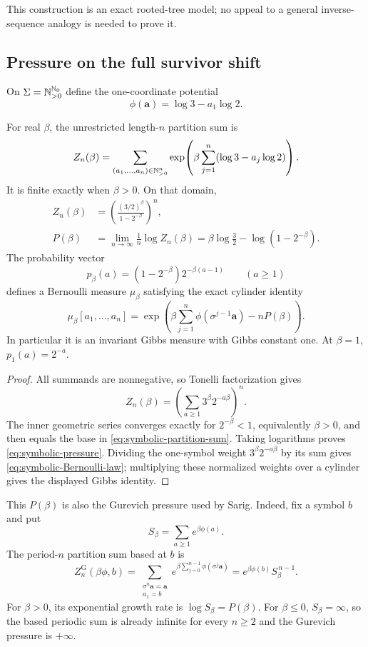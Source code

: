 This construction is an exact rooted-tree model; no appeal to a general
inverse-sequence analogy is needed to prove it.

\subsection{Pressure on the full survivor shift}

On $\Sigma=\mathbb{N}_{>0}^{\mathbb{N}_{0}}$ define the one-coordinate potential
\[
 \phi(\mathbf a)=\log3-a_1\log2.
\]

\begin{theorem}
\label{thm:symbolic-full-shift-pressure}
For real $\beta$, the unrestricted length-$n$ partition sum is
\[
 Z_n(\beta)=
 \sum_{(a_1,\ldots,a_n)\in\mathbb{N}_{>0}^n}
 \exp\!\left(\beta\sum_{j=1}^n(\log3-a_j\log2)\right).
\]
It is finite exactly when $\beta>0$.  On that domain,
\begin{align}
 Z_n(\beta)
 &=\left(\frac{(3/2)^\beta}{1-2^{-\beta}}\right)^n,\label{eq:symbolic-partition-sum}\\
 P(\beta)
 &=\lim_{n\to\infty}\frac1n\log Z_n(\beta)
 =\beta\log\frac32-\log(1-2^{-\beta}).
 \label{eq:symbolic-pressure}
\end{align}
The probability vector
\begin{equation}
\label{eq:symbolic-Bernoulli-law}
 p_\beta(a)=(1-2^{-\beta})2^{-\beta(a-1)}
 \qquad(a\geq1)
\end{equation}
defines a Bernoulli measure $\mu_\beta$ satisfying the exact cylinder
identity
\[
 \mu_\beta[a_1,\ldots,a_n]
 =\exp\!\left(
 \beta\sum_{j=1}^n\phi(\sigma^{j-1}\mathbf a)-nP(\beta)
 \right).
\]
In particular it is an invariant Gibbs measure with Gibbs constant one.
At $\beta=1$, $p_1(a)=2^{-a}$.
\end{theorem}

\begin{proof}
All summands are nonnegative, so Tonelli factorization gives
\[
 Z_n(\beta)=
 \left(\sum_{a\geq1}3^\beta2^{-a\beta}\right)^n.
\]
The inner geometric series converges exactly for $2^{-\beta}<1$, equivalently
$\beta>0$, and then equals the base in
\eqref{eq:symbolic-partition-sum}.  Taking logarithms proves
\eqref{eq:symbolic-pressure}.  Dividing the one-symbol weight
$3^\beta2^{-a\beta}$ by its sum gives
\eqref{eq:symbolic-Bernoulli-law}; multiplying these normalized weights
over a cylinder gives the displayed Gibbs identity.
\end{proof}

This $P(\beta)$ is also the Gurevich pressure used by Sarig.  Indeed, fix a
symbol $b$ and put
\[
 S_\beta=\sum_{a\geq1}e^{\beta\phi(a)}.
\]
The period-$n$ partition sum based at $b$ is
\begin{equation}
\label{eq:symbolic-gurevich-partition}
 Z_n^{\mathrm G}(\beta\phi,b)
 =\sum_{\substack{\sigma^n\mathbf a=\mathbf a\\a_1=b}}
   e^{\beta\sum_{j=0}^{n-1}\phi(\sigma^j\mathbf a)}
 =e^{\beta\phi(b)}S_\beta^{\,n-1}.
\end{equation}
For $\beta>0$, its exponential growth rate is $\log S_\beta=P(\beta)$.
For $\beta\leq0$, $S_\beta=\infty$, so the based periodic sum is already
infinite for every $n\geq2$ and the Gurevich pressure is $+\infty$.

